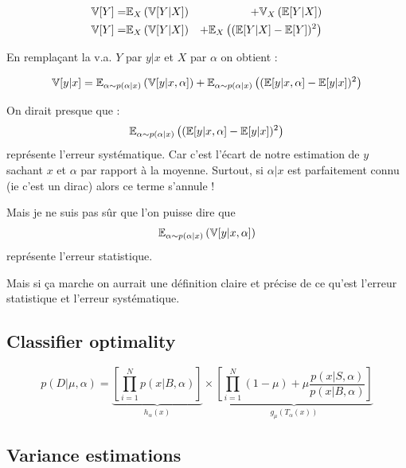 \begin{eqnarray}
    \mathbb{V}[Y] =& \mathbb{E}_X \left (\mathbb{V}[Y|X] \right ) &+ \mathbb{V}_X \left (\mathbb{E}[Y|X]\right ) \\
    \mathbb{V}[Y] =& \mathbb{E}_X \left (\mathbb{V}[Y|X] \right ) &+ \mathbb{E}_X \left ( (\mathbb{E} [Y|X]  - \mathbb{E}[Y])^2\right )
\end{eqnarray}


En remplaçant la v.a. $Y$ par $y|x$ et $X$ par $\alpha$ on obtient :

$$
\mathbb{V}[y|x] = \mathbb{E}_{\alpha \sim p(\alpha|x)} \left (\mathbb{V}[y|x, \alpha] \right ) + \mathbb{E}_{\alpha \sim p(\alpha|x)} \left ( (\mathbb{E} [y|x, \alpha]  - \mathbb{E}[y|x])^2\right )
$$


On dirait presque que : 
$$\mathbb{E}_{\alpha \sim p(\alpha|x)} \left ((\mathbb{E} [y|x, \alpha]  - \mathbb{E}[y|x])^2\right )$$
représente l'erreur systématique. 
Car c'est l'écart de notre estimation de $y$ sachant $x$ et $\alpha$ par rapport à la moyenne.
Surtout, si $\alpha|x$ est parfaitement connu (ie c'est un dirac) alors ce terme s'annule !

Mais je ne suis pas sûr que l'on puisse dire que
$$\mathbb{E}_{\alpha \sim p(\alpha|x)} \left (\mathbb{V}[y|x, \alpha] \right )$$
représente l'erreur statistique.

Mais si ça marche on aurrait une définition claire et précise de ce qu'est l'erreur statistique et l'erreur systématique.








\subsection{Classifier optimality} %
\label{sub:classifier_optimality}





\begin{equation}
	p(D|\mu, \alpha) = \underbrace{\left[ \prod_{i=1}^N p(x|B, \alpha) \right ]}_{h_\alpha(x)} \times 
       \underbrace{\left [\prod_{i=1}^N (1-\mu) + \mu \frac{p(x|S, \alpha)}{p(x|B, \alpha)} \right ]}_{g_\mu(T_\alpha(x))}
\end{equation}



\subsection{Variance estimations} %
\label{sub:variance_estimations}

